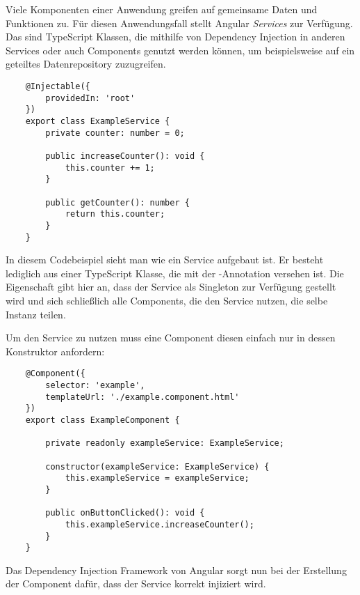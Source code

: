 Viele Komponenten einer Anwendung greifen auf gemeinsame Daten und Funktionen zu. Für diesen Anwendungsfall stellt Angular \textit{Services} zur Verfügung. Das sind TypeScript Klassen, die mithilfe von Dependency Injection in anderen Services oder auch Components genutzt werden können, um beispielsweise auf ein geteiltes Datenrepository zuzugreifen.

\begin{verbatim}
    @Injectable({
        providedIn: 'root'
    })
    export class ExampleService {
        private counter: number = 0;
        
        public increaseCounter(): void {
            this.counter += 1;
        }

        public getCounter(): number {
            return this.counter;
        }
    }
\end{verbatim}

In diesem Codebeispiel sieht man wie ein Service aufgebaut ist. Er besteht lediglich aus einer TypeScript Klasse, die mit der -Annotation versehen ist. Die Eigenschaft  gibt hier an, dass der Service als Singleton zur Verfügung gestellt wird und sich schließlich alle Components, die den Service nutzen, die selbe Instanz teilen.

Um den Service zu nutzen muss eine Component diesen einfach nur in dessen Konstruktor anfordern:

\begin{verbatim}
    @Component({
        selector: 'example',
        templateUrl: './example.component.html'
    })
    export class ExampleComponent {

        private readonly exampleService: ExampleService;

        constructor(exampleService: ExampleService) {
            this.exampleService = exampleService;
        }

        public onButtonClicked(): void {
            this.exampleService.increaseCounter();
        }
    }
\end{verbatim}

Das Dependency Injection Framework von Angular sorgt nun bei der Erstellung der Component dafür, dass der Service korrekt injiziert wird.